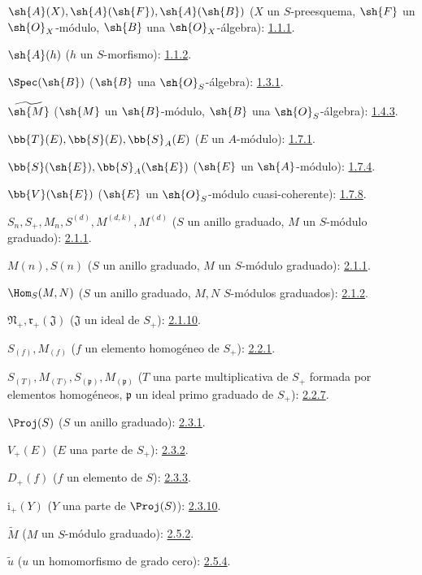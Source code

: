 \documentclass[oneside,10pt]{amsart}
\begin{document}
\begingroup
\small
\setlength{\parindent}{0pt}
\setlength{\parskip}{2pt}

$\sh{A}(X),\sh{A}(\sh{F}),\sh{A}(\sh{B})$
($X$ un $S$-preesquema, $\sh{F}$ un $\sh{O}_X$-módulo,
$\sh{B}$ una $\sh{O}_X$-álgebra): \hyperref[II.1.1.1]{1.1.1}.

$\sh{A}(h)$ ($h$ un $S$-morfismo): \hyperref[II.1.1.2]{1.1.2}.

$\Spec(\sh{B})$ ($\sh{B}$ una $\sh{O}_S$-álgebra): \hyperref[II.1.3.1]{1.3.1}.

$\widetilde{\sh{M}}$ ($\sh{M}$ un $\sh{B}$-módulo,
$\sh{B}$ una $\sh{O}_S$-álgebra): \hyperref[II.1.4.3]{1.4.3}.

$\bb{T}(E),\bb{S}(E),\bb{S}_A(E)$ ($E$ un $A$-módulo): \hyperref[II.1.7.1]{1.7.1}.

$\bb{S}(\sh{E}),\bb{S}_A(\sh{E})$
($\sh{E}$ un $\sh{A}$-módulo): \hyperref[II.1.7.4]{1.7.4}.

$\bb{V}(\sh{E})$ ($\sh{E}$ un $\sh{O}_S$-módulo cuasi-coherente): \hyperref[II.1.7.8]{1.7.8}.

$S_n,S_+,M_n,S^{(d)},M^{(d,k)},M^{(d)}$
($S$ un anillo graduado, $M$ un $S$-módulo graduado): \hyperref[II.2.1.1]{2.1.1}.

$M(n),S(n)$ ($S$ un anillo graduado, $M$ un $S$-módulo graduado): \hyperref[II.2.1.1]{2.1.1}.

$\Hom_S(M,N)$ ($S$ un anillo graduado, $M,N$ $S$-módulos graduados): \hyperref[II.2.1.2]{2.1.2}.

$\mathfrak N_+,\mathfrak r_+(\mathfrak J)$
($\mathfrak J$ un ideal de $S_+$): \hyperref[II.2.1.10]{2.1.10}.

$S_{(f)},M_{(f)}$ ($f$ un elemento homogéneo de $S_+$): \hyperref[II.2.2.1]{2.2.1}.

$S_{(T)},M_{(T)},S_{(\mathfrak p)},M_{(\mathfrak p)}$
($T$ una parte multiplicativa de $S_+$ formada por elementos homogéneos,
$\mathfrak p$ un ideal primo graduado de $S_+$): \hyperref[II.2.2.7]{2.2.7}.

$\Proj(S)$ ($S$ un anillo graduado): \hyperref[II.2.3.1]{2.3.1}.

$V_+(E)$ ($E$ una parte de $S_+$): \hyperref[II.2.3.2]{2.3.2}.

$D_+(f)$ ($f$ un elemento de $S$): \hyperref[II.2.3.3]{2.3.3}.

$\mathrm i_+(Y)$ ($Y$ una parte de $\Proj(S)$): \hyperref[II.2.3.10]{2.3.10}.

$\widetilde M$ ($M$ un $S$-módulo graduado): \hyperref[II.2.5.2]{2.5.2}.

$\widetilde u$ ($u$ un homomorfismo de grado cero): \hyperref[II.2.5.4]{2.5.4}.
\end{document}
